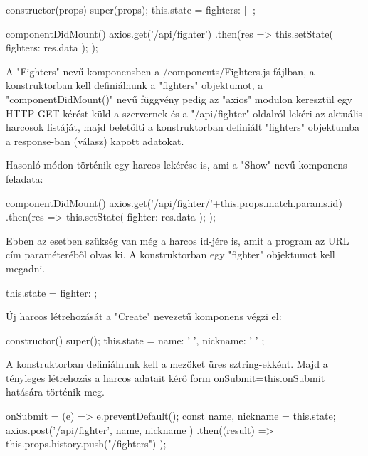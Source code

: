 


\begin{cpp}
constructor(props) {
    super(props);
    this.state = {
      fighters: []
    };
  }

  componentDidMount() {
    axios.get('/api/fighter')
      .then(res => {
        this.setState({ fighters: res.data });
      });
  }
\end{cpp}

A "Fighters" nevű komponensben a /components/Fighters.js fájlban, a konstruktorban kell definiálnunk a "fighters" objektumot, a "componentDidMount()" nevű függvény pedig az "axios" modulon keresztül egy HTTP GET kérést küld a szervernek és a "/api/fighter" oldalról lekéri az aktuális harcosok listáját, majd beletölti a konstruktorban definiált "fighters" objektumba a response-ban (válasz) kapott adatokat.

Hasonló módon történik egy harcos lekérése is, ami a "Show" nevű komponens feladata:

\begin{cpp}
componentDidMount() {
    axios.get('/api/fighter/'+this.props.match.params.id)
      .then(res => {
        this.setState({ fighter: res.data });
      });
  }
\end{cpp}

Ebben az esetben szükség van még a harcos id-jére is, amit a program az URL cím paraméteréből olvas ki. A konstruktorban egy "fighter" objektumot kell megadni.

\begin{cpp}
this.state = { fighter: {} };
\end{cpp}

Új harcos létrehozását a "Create" nevezetű komponens végzi el:

\begin{cpp}
constructor() {
    super();
    this.state = {
      name: ' ',
      nickname: ' '
    };}
\end{cpp}

A konstruktorban definiálnunk kell a mezőket üres sztring-ekként. Majd a tényleges létrehozás a harcos adatait kérő form onSubmit={this.onSubmit} hatására történik meg.

\begin{cpp}
onSubmit = (e) => {
    e.preventDefault();
    const { name, nickname} = this.state;
    axios.post('/api/fighter', { name, nickname })
      .then((result) => {
        this.props.history.push("/fighters")
      }); }
\end{cpp}


